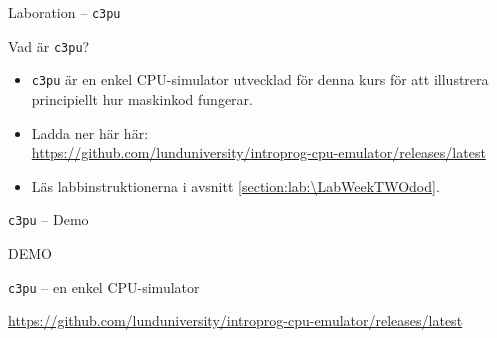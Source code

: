 \begin{Slide}{Laboration -- \texttt{c3pu}}


        \halfblankline
        \begin{itemize}
        \end{itemize}

\end{Slide}


\ifkompendium
\begin{Slide}{Vad är \texttt{c3pu}?}
\begin{itemize}
\item \texttt{c3pu} är en enkel CPU-simulator utvecklad för denna kurs för att illustrera principiellt hur maskinkod fungerar.
\item  Ladda ner här här: \\
{\small\url{https://github.com/lunduniversity/introprog-cpu-emulator/releases/latest}}
\item Läs labbinstruktionerna i avsnitt \ref{section:lab:\LabWeekTWOdod}.
\end{itemize}
\end{Slide}
\else
\begin{Slide}{\texttt{c3pu} -- Demo}

    \begin{center}
        \Huge DEMO

        {\Large \texttt{c3pu} -- en enkel CPU-simulator}

        \bigskip
        \normalsize\url{https://github.com/lunduniversity/introprog-cpu-emulator/releases/latest}
    \end{center}
\end{Slide}
\fi
